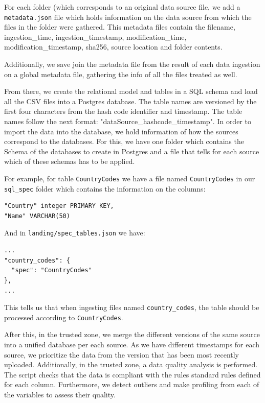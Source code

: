 For each folder (which corresponds to an original data source file, we add a \texttt{metadata.json} file
which holds information on the data source from which the files in the folder were gathered.
This metadata files contain the filename, ingestion\_time, ingestion\_timestamp,
modification\_time, modification\_timestamp, sha256, source location and folder contents.

Additionally, we save join the metadata file from the result of each data ingestion on a global metadata file, gathering the info of all the files treated as well.

From there, we create the relational model and tables in a SQL schema and load all the CSV files into a Postgres database. The table names are versioned by the first four characters from the hash code identifier and timestamp. The table names follow the next format: "dataSource\_hashcode\_timestamp".
In order to import the data into the database, we hold information of how the sources correspond to the
databases. For this, we have one folder which contains the Schema of the databases to create in Postgres
and a file that tells for each source which of these schemas has to be applied.

For example, for table \texttt{CountryCodes} we have a file named \texttt{CountryCodes} in our
\texttt{sql\_spec} folder which contains the information on the columns:

\begin{verbatim}
"Country" integer PRIMARY KEY,
"Name" VARCHAR(50)
\end{verbatim}

And in \texttt{landing/spec\_tables.json} we have:
\begin{verbatim}
...
"country_codes": {
  "spec": "CountryCodes"
},
...
\end{verbatim}

This tells us that when ingesting files named \texttt{country\_codes}, the table should be processed
according to \texttt{CountryCodes}.

After this, in the trusted zone, we merge the different versions of the same source into a unified database per each source. As we have different timestamps for each source, we prioritize the data from the version that has been most recently uploaded. Additionally, in the trusted zone, a data quality analysis is performed. The script checks that the data is compliant with the rules standard rules defined for each column. Furthermore, we detect outliers and make profiling from each of the variables to assess their quality.